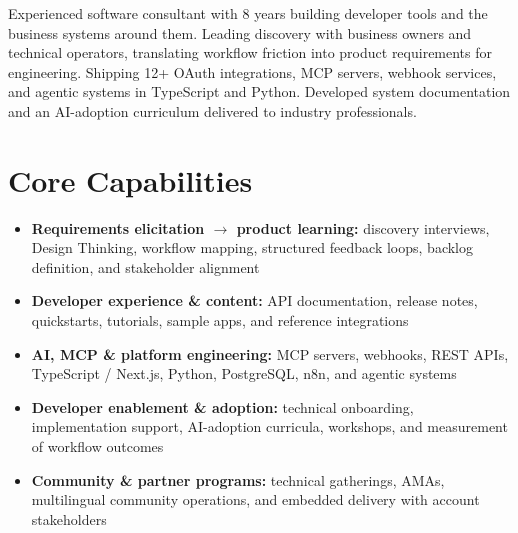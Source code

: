 \documentclass[11pt,a4paper,sans]{moderncv}
\begin{document}
\makecvtitle


\vspace{6pt}
\small{Experienced software consultant with 8 years building developer tools and the business systems around them. Leading discovery with business owners and technical operators, translating workflow friction into product requirements for engineering. Shipping 12+ OAuth integrations, MCP servers, webhook services, and agentic systems in TypeScript and Python. Developed system documentation and an AI-adoption curriculum delivered to industry professionals.}


\section{Core Capabilities}
\vspace{1pt}
\begin{itemize}

\item \textbf{Requirements elicitation $\rightarrow$ product learning:} discovery interviews, Design Thinking, workflow mapping, structured feedback loops, backlog definition, and stakeholder alignment

\item \textbf{Developer experience \& content:} API documentation, release notes, quickstarts, tutorials, sample apps, and reference integrations

\item \textbf{AI, MCP \& platform engineering:} MCP servers, webhooks, REST APIs, TypeScript / Next.js, Python, PostgreSQL, n8n, and agentic systems

\item \textbf{Developer enablement \& adoption:} technical onboarding, implementation support, AI-adoption curricula, workshops, and measurement of workflow outcomes

\item \textbf{Community \& partner programs:} technical gatherings, AMAs, multilingual community operations, and embedded delivery with account stakeholders

\end{itemize}
\end{document}
